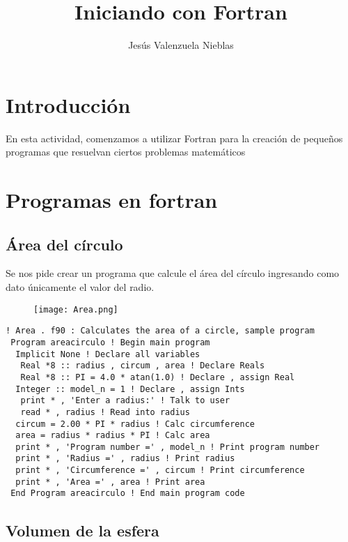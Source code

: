 \documentclass[12pt]{article}
\title{Iniciando con Fortran}
\author{Jesús Valenzuela Nieblas}
\date{}
\begin{document}
\maketitle

\section{Introducción}

En esta actividad, comenzamos a utilizar Fortran para la creación de pequeños programas que resuelvan ciertos problemas matemáticos

\section{Programas en fortran}

\subsection{Área del círculo}

Se nos pide crear un programa que calcule el área del círculo ingresando como dato únicamente el valor del radio.

\begin{figure}[h]

\centering

\texttt{[image: Area.png]}

\end{figure}

\begin{verbatim}
! Area . f90 : Calculates the area of a circle, sample program
 Program areacirculo ! Begin main program
  Implicit None ! Declare all variables
   Real *8 :: radius , circum , area ! Declare Reals
   Real *8 :: PI = 4.0 * atan(1.0) ! Declare , assign Real
  Integer :: model_n = 1 ! Declare , assign Ints
   print * , 'Enter a radius:' ! Talk to user
   read * , radius ! Read into radius
  circum = 2.00 * PI * radius ! Calc circumference
  area = radius * radius * PI ! Calc area
  print * , 'Program number =' , model_n ! Print program number
  print * , 'Radius =' , radius ! Print radius
  print * , 'Circumference =' , circum ! Print circumference
  print * , 'Area =' , area ! Print area
 End Program areacirculo ! End main program code

\end{verbatim}

\subsection{Volumen de la esfera}
\end{document}

